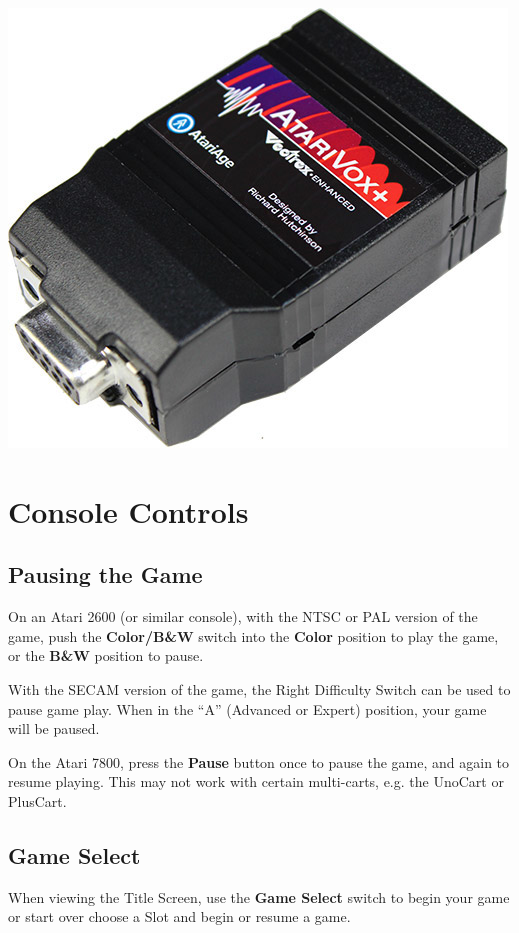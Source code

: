 \documentclass[9pt,twocolumn,openany,article]{memoir}
\begin{document}
\ifdefined\ATARIAGESAVE
\vfill
\includegraphics[width=.6667\columnwidth]{../Manual/AtariVox.jpeg}
\fi

\pagebreak
{}

\section{Console Controls}

\subsection{Pausing the Game}

On an Atari 2600  (or similar console), with the NTSC  or PAL version of
the game,  push the  \textbf{Color/B\&W} switch into  the \textbf{Color}
position  to play  the game,  or  the \textbf{B\&W}  position to  pause.

With the SECAM  version of the game, the Right  Difficulty Switch can be
used  to  pause game  play.  When  in  the  ``A'' (Advanced  or  Expert)
position, your  game will be paused.

On the  Atari 7800, press  the \textbf{Pause}  button once to  pause the
game, and again to resume playing. \ifdefined\ATARIAGESAVE\else This may
not work with certain multi-carts, e.g. the UnoCart or PlusCart. \fi

\subsection{Game Select}

When viewing  the Title Screen,  use the \textbf{Game Select}  switch to
\ifdefined\NOSAVE begin your game or start  over \else choose a Slot and
begin or resume a game. \fi
\end{document}
